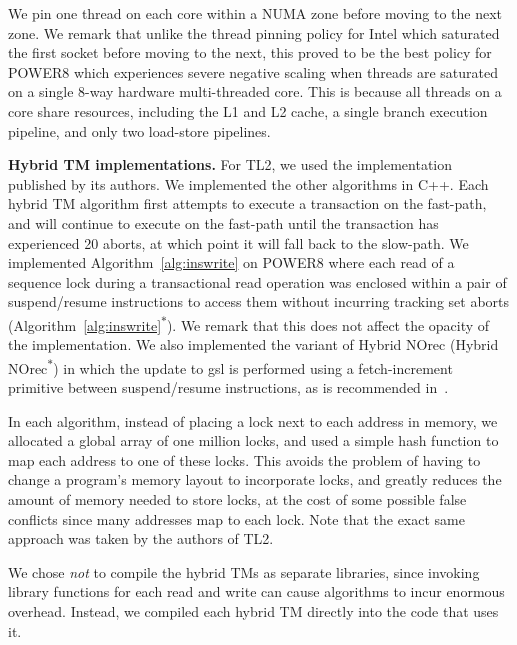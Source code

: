 We pin one thread on each core within a NUMA zone before moving to the next zone.
We remark that unlike the thread pinning policy for Intel which saturated the first socket before moving to the next, this proved to be the best policy
for POWER8 which experiences severe negative scaling when threads are saturated on a single 8-way hardware multi-threaded core.
This is because all threads on a core share resources, including the L1 and L2 cache, a single branch execution pipeline, 
and only two load-store pipelines.

\vspace{1mm}\noindent\textbf{Hybrid TM implementations.}
For TL2, we used the implementation published by its authors.
We implemented the other algorithms in C++.
Each hybrid TM algorithm first attempts to execute a transaction on the fast-path, and will continue to execute on the fast-path until the transaction has experienced 20 aborts, at which point it will fall back to the slow-path.
We implemented Algorithm~\ref{alg:inswrite} on POWER8 where each read of a sequence lock during a transactional read operation was enclosed within a pair of suspend/resume instructions to access them without 
incurring tracking set aborts (Algorithm~\ref{alg:inswrite}\textsuperscript{$\ast$}). We remark that this does not affect the opacity of the implementation. 
We also implemented the variant of Hybrid NOrec (Hybrid NOrec\textsuperscript{$\ast$}) in which the update to gsl is performed using a fetch-increment primitive between suspend/resume instructions, as is recommended in~\cite{hynorecriegel}.

In each algorithm, instead of placing a lock next to each address in memory, we allocated a global array of one million locks, and used a simple hash function to map each address to one of these locks.
This avoids the problem of having to change a program's memory layout to incorporate locks, and greatly reduces the amount of memory needed to store locks, at the cost of some possible false conflicts since many addresses map to each lock.
Note that the exact same approach was taken by the authors of TL2.

We chose \textit{not} to compile the hybrid TMs as separate libraries, since invoking library functions for each read and write can cause algorithms to incur enormous overhead.
Instead, we compiled each hybrid TM directly into the code that uses it.

